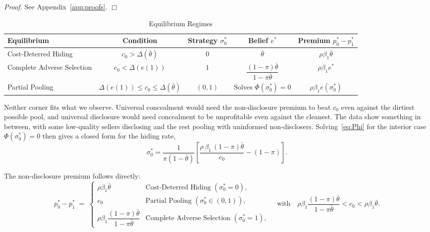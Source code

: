 \noindent\textit{Proof.} See Appendix~\ref{app:proofs}. $\Box$

\begin{table}[h]
\centering
\caption{Equilibrium Regimes}
\label{tab:equilibria}
\small\renewcommand{\arraystretch}{1.5}
\begin{tabular}{lcccc}
\toprule\toprule
\textbf{Equilibrium} & \textbf{Condition} & \textbf{Strategy $\sigma_0^*$} & \textbf{Belief $e^*$} & \textbf{Premium $p_0^*-p_1^*$} \\
\midrule
Cost-Deterred Hiding       & $c_0>\Delta(\bar{\theta})$                     & $0$     & $\bar{\theta}$                                          & $\rho\beta_1\bar{\theta}$ \\
Complete Adverse Selection & $c_0<\Delta(e(1))$                             & $1$     & $\dfrac{(1-\pi)\bar{\theta}}{1-\pi\bar{\theta}}$        & $\rho\beta_1 e^*$ \\[6pt]
Partial Pooling            & $\Delta(e(1))\leq c_0\leq\Delta(\bar{\theta})$ & $(0,1)$ & Solves $\Phi(\sigma_0^*)=0$                             & $\rho\beta_1 e(\sigma_0^*)$ \\
\bottomrule\bottomrule
\end{tabular}
\end{table}

Neither corner fits what we observe. Universal concealment would need the non-disclosure premium to beat $c_0$ even against the dirtiest possible pool, and universal disclosure would need concealment to be unprofitable even against the cleanest. The data show something in between, with some low-quality sellers disclosing and the rest pooling with uninformed non-disclosers. Solving~\eqref{eq:Phi} for the interior case $\Phi(\sigma_0^*)=0$ then gives a closed form for the hiding rate,
\[
\sigma_0^* = \frac{1}{\pi(1-\bar{\theta})}\left[\frac{\rho\,\beta_1\,(1-\pi)\bar{\theta}}{c_0} - (1-\pi)\right].
\]

The non-disclosure premium follows directly:
\begin{equation}
    p_0^*-p_1^* \;=\;
    \begin{cases}
        \rho\beta_1\bar{\theta}
            & \text{Cost-Deterred Hiding }(\sigma_0^*=0), \\[4pt]
        c_0
            & \text{Partial Pooling }(\sigma_0^*\in(0,1)), \\[4pt]
        \rho\beta_1\dfrac{(1-\pi)\bar{\theta}}{1-\pi\bar{\theta}}
            & \text{Complete Adverse Selection }(\sigma_0^*=1),
    \end{cases}
    \quad \text{with}\quad \rho\beta_1\frac{(1-\pi)\bar{\theta}}{1-\pi\bar{\theta}} < c_0 < \rho\beta_1\bar{\theta}.
    \label{eq:premium}
\end{equation}


